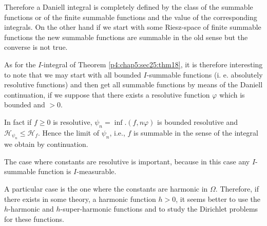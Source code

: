 Therefore a Daniell integral is completely defined by the class of the
summable functions or of the finite summable functions and the value
of the corresponding integrals. On the other hand if we start with
some Riesz-space of finite summable functions the new summable
functions are summable in the old sense but the converse is not true. 

As for the $I$-integral of Theorem \ref{p4:chap5:sec25:thm18}, it is therefore interesting to
note that we may start with all bounded $I$-summable functions
(i. e. absolutely resolutive functions) and then get all summable
functions by means of the Daniell continuation, if we suppose that
there exists a resolutive function $\varphi$ which is bounded and $ >
0$. 

In fact if $f \geq 0$ is resolutive, $\psi_n = \inf.  (f, n \varphi)$
is bounded resolutive and $\mathscr{H}_{\psi_n} \leq
\mathscr{H}_f$. Hence the limit of $\psi_n$, i.e., $f$ is summable in
the sense of the integral we obtain by continuation. 
\begin{remark}%
  The case where constants are resolutive is important, because in
  this case any $I$-summable function is $I$-measurable. 
\end{remark}

A particular case is the one where the constants are harmonic
in $\Omega$. Therefore, if there exists in some theory, a harmonic function $h
> 0$, it seems better to use the $h$-harmonic and $h$-super-harmonic
functions and to study the Dirichlet problems for these functions. 
